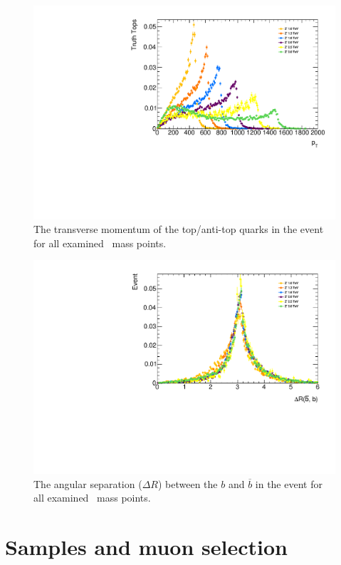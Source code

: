 \begin{figure}[t]
\includegraphics[width=\textwidth]{PartBoosted/Plots/h_trtop_pt.pdf}
\caption{The transverse momentum of the top/anti-top quarks in the event for all examined \Zprime\ mass points.} \label{fig:ExampleBoost}
\end{figure}

\begin{figure}[t]
\includegraphics[width=\textwidth]{PartBoosted/Plots/h_b_bbar_dr.pdf}
\caption{The angular separation ($\Delta R$) between the $b$ and $\overline{b}$ in the event for all examined \Zprime\ mass points.} \label{fig:ExampleBackToBack}
\end{figure}

\section{Samples and muon selection}

